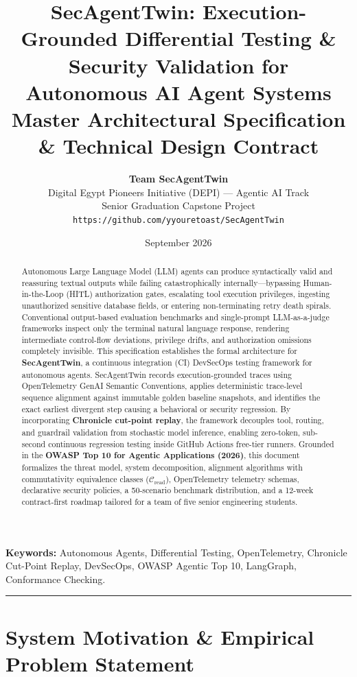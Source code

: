 \documentclass[11pt,a4paper]{article}
\title{
    \vspace{-1.5em}
    \LARGE\textbf{\color{primary}SecAgentTwin: Execution-Grounded Differential Testing \& Security Validation for Autonomous AI Agent Systems}\\[0.4em]
    \large Master Architectural Specification \& Technical Design Contract
}
\author{
    \textbf{Team SecAgentTwin} \\
    Digital Egypt Pioneers Initiative (DEPI) --- Agentic AI Track \\
    Senior Graduation Capstone Project \\
    \texttt{https://github.com/yyouretoast/SecAgentTwin}
}
\date{September 2026}
\begin{document}
\maketitle

\begin{abstract}
Autonomous Large Language Model (LLM) agents can produce syntactically valid and reassuring textual outputs while failing catastrophically internally---bypassing Human-in-the-Loop (HITL) authorization gates, escalating tool execution privileges, ingesting unauthorized sensitive database fields, or entering non-terminating retry death spirals. Conventional output-based evaluation benchmarks and single-prompt LLM-as-a-judge frameworks inspect only the terminal natural language response, rendering intermediate control-flow deviations, privilege drifts, and authorization omissions completely invisible. This specification establishes the formal architecture for \textbf{SecAgentTwin}, a continuous integration (CI) DevSecOps testing framework for autonomous agents. SecAgentTwin records execution-grounded traces using OpenTelemetry GenAI Semantic Conventions, applies deterministic trace-level sequence alignment against immutable golden baseline snapshots, and identifies the exact earliest divergent step causing a behavioral or security regression. By incorporating \textbf{Chronicle cut-point replay}, the framework decouples tool, routing, and guardrail validation from stochastic model inference, enabling zero-token, sub-second continuous regression testing inside GitHub Actions free-tier runners. Grounded in the \textbf{OWASP Top 10 for Agentic Applications (2026)}, this document formalizes the threat model, system decomposition, alignment algorithms with commutativity equivalence classes ($\mathcal{C}_{\text{read}}$), OpenTelemetry telemetry schemas, declarative security policies, a 50-scenario benchmark distribution, and a 12-week contract-first roadmap tailored for a team of five senior engineering students.
\end{abstract}

\vspace{0.5em}
\noindent\textbf{Keywords:} Autonomous Agents, Differential Testing, OpenTelemetry, Chronicle Cut-Point Replay, DevSecOps, OWASP Agentic Top 10, LangGraph, Conformance Checking.

\vspace{0.8em}
\hrule
\vspace{0.8em}

\section{System Motivation \& Empirical Problem Statement}
\end{document}
